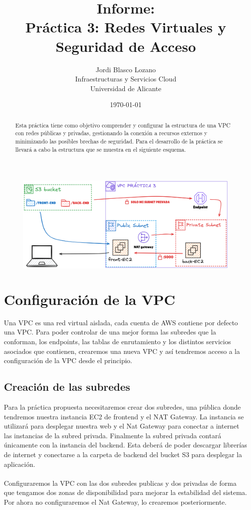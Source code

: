 \documentclass{article}
\title{Informe: \\ Práctica 3: Redes Virtuales y Seguridad de Acceso}
\author{
	Jordi Blasco Lozano \\
	\small Infraestructuras y Servicios Cloud \\
	\small Universidad de Alicante
}
\date{\today}
\begin{document}
	
	\maketitle

	\begin{abstract}
	\noindent Esta práctica tiene como objetivo comprender y configurar la estructura de una VPC con redes públicas y privadas, gestionando la conexión a recursos externos y minimizando las posibles brechas de seguridad. Para el desarrollo de la práctica se llevará a cabo la estructura que se muestra en el siguiente esquema.
	\end{abstract}
	\vspace{1cm} 
	\begin{figure}[H]
	\centerline{
	\includegraphics[width=1.1\textwidth]{esquema.png}}
	\end{figure}

	\newpage
	\tableofcontents

	\newpage

	\section{Configuración de la VPC}

	Una VPC es una red virtual aislada, cada cuenta de AWS contiene por defecto una VPC. Para poder controlar de una mejor forma las subredes que la conforman, los endpoints, las tablas de enrutamiento y los distintos servicios asociados que contienen, crearemos una nueva VPC y así tendremos acceso a la configuración de la VPC desde el principio.
		
	\subsection{Creación de las subredes}

	Para la práctica propuesta necesitaremos crear dos subredes, una pública donde tendremos nuestra instancia EC2 de frontend y el NAT Gateway. La instancia se utilizará para desplegar nuestra web y el Nat Gateway para conectar a internet las instancias de la subred privada. Finalmente la subred privada contará únicamente con la instancia del backend. Esta deberá de poder descargar librerías de internet y conectarse a la carpeta de backend del bucket S3 para desplegar la aplicación.
\\
\\
	Configuraremos la VPC con las dos subredes publicas y dos privadas de forma que tengamos dos zonas de disponibilidad para mejorar la estabilidad del sistema. Por ahora no configuraremos el Nat Gateway, lo crearemos posteriormente.
\end{document}
